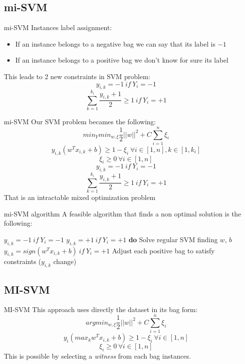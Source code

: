 \subsection{mi-SVM}
\begin{frame}{mi-SVM}
	Instances label assignment:
	\begin{itemize}\setlength\itemsep{1em}
		\item If an instance belongs to a negative bag we can say that its label is $-1$
		\item If an instance belongs to a positive bag we don't know for sure its label
	\end{itemize}
	\vspace{12px}
	This leads to 2 new constraints in SVM problem:
	$$y_{i,k} = -1 \ if \ Y_i = -1$$
	$$\sum_{k = 1}^{k_i}\frac{y_{i,k} + 1}{2} \geq 1 \ if \ Y_i = +1$$
\end{frame}

\begin{frame}{mi-SVM}
	Our SVM problem becames the following:
	$$min_Y min_{w, \xi} \frac{1}{2} ||w||^2 + C \sum_{i = 1}^{n}\xi_i$$
	$$y_{i,k} (w^T x_{i,k} + b) \geq 1 - \xi_i \ \forall i \in [1, n], k \in [1, k_i]$$
	$$\xi_i \geq 0 \ \forall i \in [1, n]$$
	$$y_{i,k} = -1 \ if \ Y_i = -1$$
	$$\sum_{k = 1}^{k_i}\frac{y_{i,k} + 1}{2} \geq 1 \ if \ Y_i = +1$$
	That is an intractable mixed optimization problem
\end{frame}

\begin{frame}{mi-SVM algorithm}
	A feasible algorithm that finds a non optimal solution is the following:
	
	\begin{codebox}
		\li $y_{i,k} = -1 \ if \ Y_i = -1$
		\li $y_{i,k} = +1 \ if \ Y_i = +1$
		\li \textbf{do} \Do
		\li Solve regular SVM finding $w$, $b$
		\li $y_{i,k} = sign(w^T x_{i,k} + b) \ if \ Y_i = +1$
		\li Adjust each positive bag to satisfy constraints \End
		\li \While($y_{i,k}$ change)
		
	\end{codebox}
	
\end{frame}

\subsection{MI-SVM}
\begin{frame}{MI-SVM}
	This approach uses directly the dataset in its bag form:
	$$arg min_{w, \xi} \frac{1}{2} ||w||^2 + C \sum_{i = 1}^{n}\xi_i$$
	$$y_i (max_k w^T x_{i,k} + b) \geq 1 - \xi_i \ \forall i \in [1, n]$$
	$$\xi_i \geq 0 \ \forall i \in [1, n]$$
	This is possible by selecting a \textit{witness} from each bag instances.
\end{frame}

